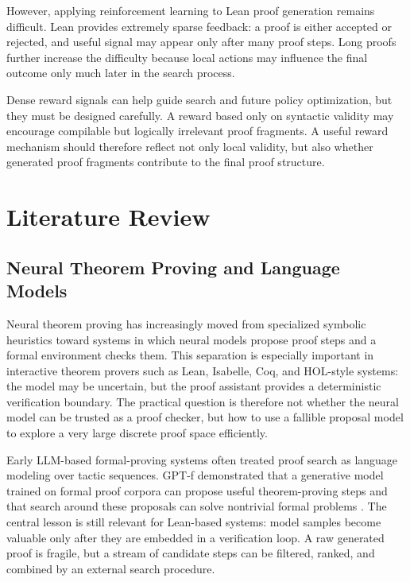 \documentclass[en]{uet_awesome_thesis/uet-awesome-thesis}
\begin{document}
However, applying reinforcement learning to Lean proof generation remains difficult. Lean provides extremely sparse feedback: a proof is either accepted or rejected, and useful signal may appear only after many proof steps. Long proofs further increase the difficulty because local actions may influence the final outcome only much later in the search process.

Dense reward signals can help guide search and future policy optimization, but they must be designed carefully. A reward based only on syntactic validity may encourage compilable but logically irrelevant proof fragments. A useful reward mechanism should therefore reflect not only local validity, but also whether generated proof fragments contribute to the final proof structure.

\chapter{Literature Review}
\label{sec:literature}

\section{Neural Theorem Proving and Language Models}

Neural theorem proving has increasingly moved from specialized symbolic heuristics toward systems in
which neural models propose proof steps and a formal environment checks them. This separation is
especially important in interactive theorem provers such as Lean, Isabelle, Coq, and HOL-style systems:
the model may be uncertain, but the proof assistant provides a deterministic verification boundary.
The practical question is therefore not whether the neural model can be trusted as a proof checker, but
how to use a fallible proposal model to explore a very large discrete proof space efficiently.

Early LLM-based formal-proving systems often treated proof search as language modeling over tactic
sequences. GPT-f demonstrated that a generative model trained on formal proof corpora can propose
useful theorem-proving steps and that search around these proposals can solve nontrivial formal
problems \citep{polu2020gptf}. The central lesson is still relevant for Lean-based systems: model
samples become valuable only after they are embedded in a verification loop. A raw generated proof is
fragile, but a stream of candidate steps can be filtered, ranked, and combined by an external search
procedure.
\end{document}
